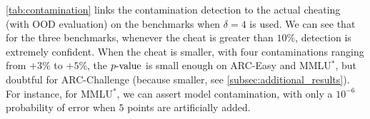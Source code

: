 \autoref{tab:contamination} links the contamination detection to the actual cheating (with OOD evaluation) on the benchmarks when $\delta=4$ is used.
We can see that for the three benchmarks, whenever the cheat is greater than $10\%$, detection is extremely confident.
When the cheat is smaller, with four contaminations ranging from $+3\%$ to $+5\%$, the $p\textrm{-value}$ is small enough on ARC-Easy and MMLU$^*$, but doubtful for ARC-Challenge (because smaller, see \autoref{subsec:additional_results}).
For instance, for MMLU$^*$, we can assert model contamination, with only a $10^{-6}$ probability of error when $5$ points are artificially added.





